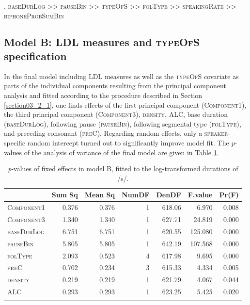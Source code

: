 \ex.
\label{ex:5.1}
\textsc{baseDurLog} >> \textsc{pauseBin} >> \textsc{typeOfS} >> \textsc{folType} >> \textsc{speakingRate} >> \textsc{biphoneProbSumBin}

\subsection{Model B: LDL measures and \textsc{typeOfS} specification}\label{section05_3_2}

In the final model including LDL measures as well as the \textsc{typeOfS} covariate as parts of the individual components resulting from the principal component analysis and fitted according to the procedure described in Section \ref{section03_2_1}, one finds effects of the first principal component (\textsc{Component1}), the third principal component (\textsc{Component3}), \textsc{density}, \textsc{ALC}, base duration (\textsc{baseDurLog}), following pause (\textsc{pauseBin}), following segmental type (\textsc{folType}), and preceding consonant (\textsc{preC}). Regarding random effects, only a \textsc{speaker}-specific random intercept turned out to significantly improve model fit. The \textit{p}-values of the analysis of variance of the final model are given in Table \ref{tab:5.8}.

\begin{table}\fontsize{10}{11}
\caption{\textit{p}-values of fixed effects in model B, fitted to the log-transformed durations of /s/.}
\label{tab:5.8}
\centering
\begin{tabular}{lrrrrrr} 
\lsptoprule
~          & Sum Sq & Mean Sq & NumDF & DenDF  & F.value & Pr(F)  \\ 
\midrule
\textsc{Component1} & 0.376  & 0.376   & 1     & 618.06 & 6.970   & 0.008  \\
\textsc{Component3} & 1.340  & 1.340   & 1     & 627.71 & 24.819  & 0.000  \\
\textsc{baseDurLog} & 6.751  & 6.751   & 1     & 620.55 & 125.080 & 0.000  \\
\textsc{pauseBin}   & 5.805  & 5.805   & 1     & 642.19 & 107.568 & 0.000  \\
\textsc{folType}    & 2.093  & 0.523   & 4     & 617.98 & 9.695   & 0.000  \\
\textsc{preC}       & 0.702  & 0.234   & 3     & 615.33 & 4.334   & 0.005  \\
\textsc{density}    & 0.219  & 0.219   & 1     & 621.79 & 4.067   & 0.044  \\
\textsc{ALC}        & 0.293  & 0.293   & 1     & 623.25 & 5.425   & 0.020  \\
\lspbottomrule
\end{tabular}
\end{table}

